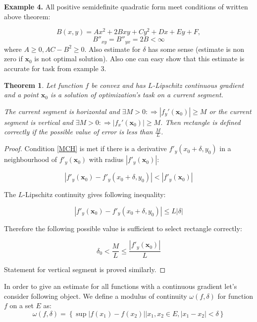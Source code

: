 \documentclass[12pt]{article}
\newtheorem{theorem}{Theorem}[section]
\begin{document}
\textbf{Example 4.} All positive semidefinite quadratic form meet conditions of written above theorem:

$$B(x,y) = Ax^2 + 2Bxy + Cy^2 + Dx +Ey + F,$$
$$B''_{xy} = B''_{yx} = 2B < \infty$$
where $A \geq 0,AC - B^2\geq0$. Also estimate for $\delta$ has some sense (estimate is non zero if $\textbf{x}_0$ is not optimal solution). Also one can easy show that this estimate is accurate for task from example 3.

\begin{theorem}
Let function $f$ be convex and has $L$-Lipschitz continuous gradient and a point $\textbf{x}_0$ is a solution of optimization's  task on a current segment. 

The current segment is horizontal and $\exists M>0  : \Rightarrow|f_y'(\textbf{x}_0)| \geq M$ or the current segment is vertical and $\exists M>0  : \Rightarrow|f_x'(\textbf{x}_0)| \geq M$. Then rectangle is defined correctly if the possible value of error is less than $\frac{M}{L}$.
\end{theorem}
\begin{proof}
Condition \eqref{MCH} is met if there is a derivative $f'_y(x_0+\delta, y_0)$ in a neighbourhood of 
$f'_y(\textbf{x}_0)$ with radius $\left|f'_y(\textbf{x}_0)\right|$:

$$\left|f'_y(\textbf{x}_0) - f'_y(x_0+\delta, y_0)\right|<\left|f'_y(\textbf{x}_0)\right|$$

The $L$-Lipschitz continuity gives following inequality:

$$\left|f'_y(\textbf{x}_0) - f'_y(x_0+\delta, y_0)\right| \leq L|\delta|$$

Therefore the following possible value is sufficient to select rectangle correctly:

$$\delta_0 < \frac{M}{L} \leq \frac{\left|f'_y(\textbf{x}_0)\right|}{L}$$

Statement for vertical segment is proved similarly.
\end{proof}


In order to give an estimate for all functions with a continuous gradient let's consider following object. We define a modulus of continuity $\omega(f, \delta)$  for function $f$ on a set $E$ as:
$$\omega(f, \delta) = \left\{\sup|f(x_1) - f(x_2)|\Big|x_1, x_2\in E, |x_1-x_2|<\delta\right\}$$
\end{document}
